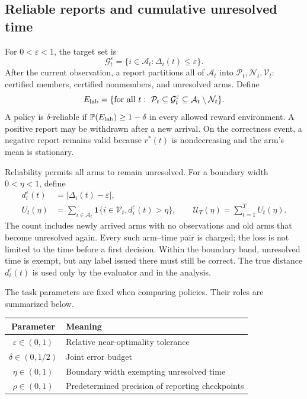 \documentclass[11pt]{article}
\theoremstyle{remark}
\newcommand{\Prob}{\mathbb P}
\newcommand{\ind}{\mathbf 1}
\begin{document}
\subsection{Reliable reports and cumulative unresolved time}
\label{sec:reporting_task}

For $0<\varepsilon<1$, the target set is
\[
 \mathcal G_t^\varepsilon=\{i\in\mathcal A_t:\Delta_i(t)\le\varepsilon\}.
\]
After the current observation, a report partitions all of $\mathcal A_t$
into $\mathcal P_t,\mathcal N_t,\mathcal V_t$: certified members, certified
nonmembers, and unresolved arms. Define
\[
 E_{\rm lab}=\{\text{for all }t:\ \mathcal P_t\subseteq\mathcal G_t^\varepsilon
                  \subseteq\mathcal A_t\setminus\mathcal N_t\}.
\]
A policy is $\delta$-reliable if $\Prob(E_{\rm lab})\ge1-\delta$ in every
allowed reward environment. A positive report may be withdrawn after a new
arrival. On the correctness event, a negative report remains valid because
$r^*(t)$ is nondecreasing and the arm's mean is stationary.

Reliability permits all arms to remain unresolved. For a boundary width
$0<\eta<1$, define
\begin{equation}
 \begin{split}
 d_i^\varepsilon(t)&=|\Delta_i(t)-\varepsilon|,\\
 U_t(\eta)&=\sum_{i\in\mathcal A_t}
   \ind\{i\in\mathcal V_t,d_i^\varepsilon(t)>\eta\},\qquad
 \mathcal U_T(\eta)=\sum_{t=1}^{T}U_t(\eta).
 \end{split}
 \label{eq:area}
\end{equation}
The count includes newly arrived arms with no observations and old arms
that become unresolved again. Every such arm--time pair is charged; the
loss is not limited to the time before a first decision. Within the
boundary band, unresolved time is exempt, but any label issued there must
still be correct. The true distance $d_i^\varepsilon(t)$ is used only by
the evaluator and in the analysis.

The task parameters are fixed when comparing policies. Their roles are
summarized below.
\begin{center}
\begin{tabular}{cl}
\toprule
Parameter & Meaning\\
\midrule
$\varepsilon\in(0,1)$ & Relative near-optimality tolerance\\
$\delta\in(0,1/2)$ & Joint error budget\\
$\eta\in(0,1)$ & Boundary width exempting unresolved time\\
$\rho\in(0,1)$ & Predetermined precision of reporting checkpoints\\
\bottomrule
\end{tabular}
\end{center}
\end{document}
